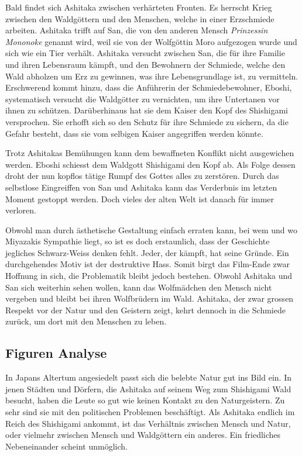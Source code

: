 Bald findet sich Ashitaka zwischen verhärteten Fronten. Es herrscht Krieg zwischen den Waldgöttern und den Menschen, welche in einer Erzschmiede arbeiten. Ashitaka trifft auf San, die von den anderen Mensch \emph{Prinzessin Mononoke} genannt wird, weil sie von der Wolfgöttin Moro aufgezogen wurde und sich wie ein Tier verhält. Ashitaka versucht zwischen San, die für ihre Familie und ihren Lebensraum kämpft, und den Bewohnern der Schmiede, welche den Wald abholzen um Erz zu gewinnen, was ihre Lebensgrundlage ist, zu vermitteln. Erschwerend kommt hinzu, dass die Anführerin der Schmiedebewohner, Eboshi, systematisch versucht die Waldgötter zu vernichten, um ihre Untertanen vor ihnen zu schützen. Darüberhinaus hat sie dem Kaiser den Kopf des Shishigami versprochen. Sie erhofft sich so den Schutz für ihre Schmiede zu sichern, da die Gefahr besteht, dass sie vom selbigen Kaiser angegriffen werden könnte. 

Trotz Ashitakas Bemühungen kann dem bewaffneten Konflikt nicht ausgewichen werden. Eboshi schiesst dem Waldgott Shishigami den Kopf ab. Als Folge dessen droht der nun kopflos tätige Rumpf des Gottes alles zu zerstören. Durch das selbstlose Eingreiffen von San und Ashitaka kann das Verderbnis im letzten Moment gestoppt werden. Doch vieles der alten Welt ist danach für immer verloren.

Obwohl man durch ästhetische Gestaltung einfach erraten kann, bei wem und wo Miyazakis Sympathie liegt, so ist es doch erstaunlich, dass der Geschichte jegliches Schwarz-Weiss denken fehlt. Jeder, der kämpft, hat seine Gründe. Ein durchgehendes Motiv ist der destruktive Hass. Somit birgt das Film-Ende zwar Hoffnung in sich, die Problematik bleibt jedoch bestehen. 
Obwohl Ashitaka und San sich weiterhin sehen wollen, kann das Wolfmädchen den Mensch nicht vergeben und bleibt bei ihren Wolfbrüdern im Wald. Ashitaka, der zwar grossen Respekt vor der Natur und den Geistern zeigt, kehrt dennoch in die Schmiede zurück, um dort mit den Menschen zu leben.  

\subsection{Figuren Analyse}
In Japans Altertum angesiedelt passt sich die belebte Natur gut ins Bild ein. In jenen Städten und Dörfern, die Ashitaka auf seinem Weg zum Shishigami Wald besucht, haben die Leute so gut wie keinen Kontakt zu den Naturgeistern. Zu sehr sind sie mit den politischen Problemen beschäftigt. Als Ashitaka endlich im Reich des Shishigami ankommt, ist das Verhältnis zwischen Mensch und Natur, oder vielmehr zwischen Mensch und Waldgöttern ein anderes. Ein friedliches Nebeneinander scheint unmöglich. 


